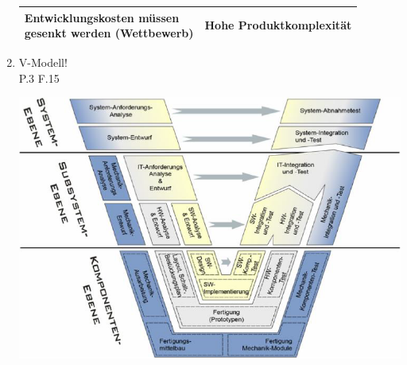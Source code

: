 \documentclass[10pt,a4paper,fleqn]{article}
\begin{document}
\begin{enumerate}
\begin{center}
\begin{tabular}{|l|l|}
					\hline 
					\pbox{20cm}{ Entwicklungskosten müssen \\ gesenkt werden (Wettbewerb) } &  Hohe Produktkomplexität \\ 
					\hline 
				\end{tabular}
			\end{center}
	\item V-Modell!\\
		P.3 F.15\\
		\begin{center}
			\includegraphics[scale=0.5]{v.png}
		\end{center}

\end{enumerate}
\end{document}
